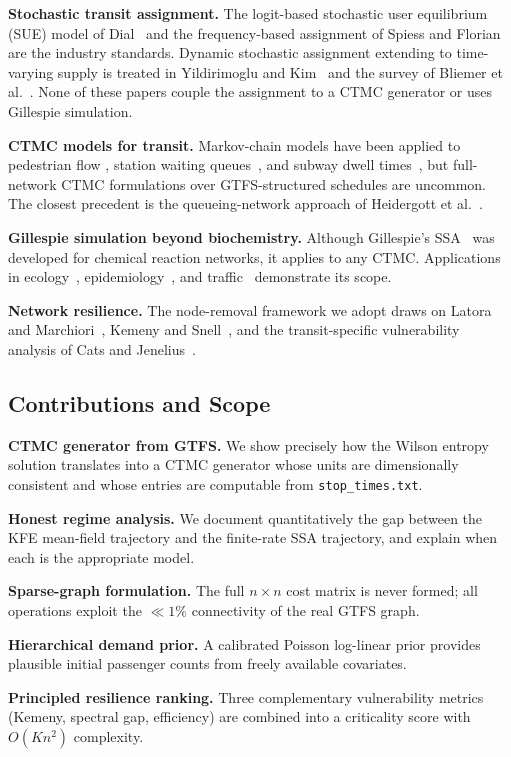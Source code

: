 \documentclass[11pt,a4paper]{article}
\theoremstyle{plain}
\theoremstyle{definition}
\theoremstyle{remark}
\begin{document}
\textbf{Stochastic transit assignment.}
The logit-based stochastic user equilibrium (SUE) model of Dial~\cite{dial1971}
and the frequency-based assignment of Spiess and Florian~\cite{spiess1989} are
the industry standards.  Dynamic stochastic assignment extending to
time-varying supply is treated in Yildirimoglu and Kim~\cite{yildirimoglu2018}
and the survey of Bliemer et al.~\cite{bliemer2003}.  None of these papers
couple the assignment to a CTMC generator or uses Gillespie simulation.

\textbf{CTMC models for transit.}
Markov-chain models have been applied to pedestrian flow
\cite{helbing2000},
station waiting queues~\cite{jaiswal1961}, and subway dwell
times~\cite{zhang2019}, but full-network CTMC formulations over
GTFS-structured schedules are uncommon.  The closest precedent is the
queueing-network approach of Heidergott et al.~\cite{heidergott2010}.

\textbf{Gillespie simulation beyond biochemistry.}
Although Gillespie's SSA~\cite{gillespie1977} was developed for chemical
reaction networks, it applies to any CTMC.  Applications in
ecology~\cite{wilkinson2018}, epidemiology~\cite{allen2008}, and
traffic~\cite{maerivoet2005} demonstrate its scope.

\textbf{Network resilience.}
The node-removal framework we adopt draws on Latora and
Marchiori~\cite{latora2001}, Kemeny and Snell~\cite{kemeny1976}, and the
transit-specific vulnerability analysis of Cats and
Jenelius~\cite{cats2014}.

\subsection{Contributions and Scope}

\begin{description}[leftmargin=2em]
  \item[C1.] \textbf{CTMC generator from GTFS.}  We show precisely how the
    Wilson entropy solution translates into a CTMC generator whose units are
    dimensionally consistent and whose entries are computable from
    \texttt{stop\_times.txt}.
  \item[C2.] \textbf{Honest regime analysis.}  We document quantitatively the
    gap between the KFE mean-field trajectory and the finite-rate SSA
    trajectory, and explain when each is the appropriate model.
  \item[C3.] \textbf{Sparse-graph formulation.}  The full $n\times n$ cost
    matrix is never formed; all operations exploit the $\ll1\%$ connectivity
    of the real GTFS graph.
  \item[C4.] \textbf{Hierarchical demand prior.}  A calibrated Poisson
    log-linear prior provides plausible initial passenger counts from freely
    available covariates.
  \item[C5.] \textbf{Principled resilience ranking.}  Three complementary
    vulnerability metrics (Kemeny, spectral gap, efficiency) are combined into
    a criticality score with $O(Kn^2)$ complexity.
\end{description}
\end{document}
